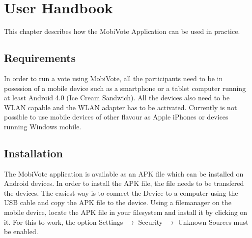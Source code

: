 \documentclass[numbers=noenddot, abstract=on, a4paper, headsepline,
footsepline, oneside, draft=off]{scrreprt}
\begin{document}
\chapter{User Handbook}
This chapter describes how the MobiVote Application can be used in practice.

\section{Requirements}
In order to run a vote using MobiVote, all the participants need to be in
posession of a mobile device such as a smartphone or a tablet computer running
at least Android 4.0 (Ice Cream Sandwich). All the devices also need to be WLAN
capable and the WLAN adapter has to be activated. Currently is not possible to
use mobile devices of other flavour as Apple iPhones or devices running Windows
mobile.

\section{Installation}
The MobiVote application is available as an APK file which can be installed on
Android devices. In order to install the APK file, the file needs to be
transfered the devices. The easiest way is to connect the Device to a computer
using the USB cable and copy the APK file to the device. Using a filemanager on
the mobile device, locate the APK file in your filesystem and install it by
clicking on it. For this to work, the option
Settings $\rightarrow$ Security $\rightarrow$ Unknown Sources
must be enabled. 



\listoftodos
\end{document}
